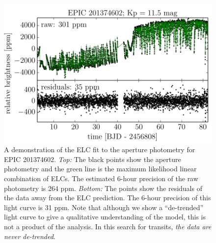 \documentclass[12pt,preprint]{aastex}
\newcommand{\figlabel}[1]{\label{fig:#1}}
\begin{document}
\begin{figure}[p]
\begin{center}
\includegraphics{figures/corr.pdf}
\end{center}
\caption{%
A demonstration of the ELC fit to the aperture photometry for EPIC 201374602.
\emph{Top:} The black points show the aperture photometry and the green line
is the maximum likelihood linear combination of ELCs.
The estimated 6-hour precision of the raw photometry is 264 ppm.
\emph{Bottom:} The points show the residuals of the data away from the ELC
prediction.
The 6-hour precision of this light curve is 31 ppm.
Note that although we show a ``de-trended'' light curve to give a qualitative
understanding of the model, this is not a product of the analysis.
In this search for transits, \emph{the data are never de-trended}.
\figlabel{corr}}
\end{figure}
\end{document}
